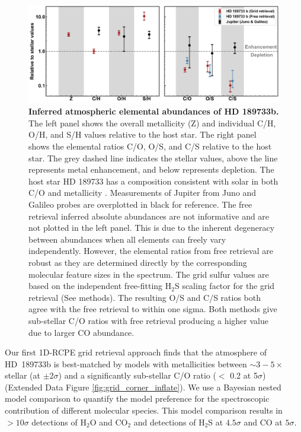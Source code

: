 \documentclass[sn-standardnature]{sn-jnl}%
\begin{document}
\begin{figure}
\centering
  \includegraphics[width=\textwidth,keepaspectratio]{figs/Fig4.pdf}
  \caption{\textbf{Inferred atmospheric elemental abundances of HD 189733b.} The left panel shows the overall metallicity (Z) and individual C/H, O/H, and S/H values relative to the host star. The right panel shows the elemental ratios C/O, O/S, and C/S relative to the host star. The grey dashed line indicates the stellar values, above the line represents metal enhancement, and below represents depletion. The host star HD 189733 has a composition consistent with solar in both C/O and metallicity \cite{brewer_co_2016}.  Measurements of Jupiter from Juno and Galileo probes \cite{atreya_origin_2016, li_water_2020} are overplotted in black for reference. The free retrieval inferred absolute abundances are not informative and are not plotted in the left panel. This is due to the inherent degeneracy between abundances when all elements can freely vary independently. However, the elemental ratios from free retrieval are robust as they are determined directly by the corresponding molecular feature sizes in the spectrum. The grid sulfur values are based on the independent free-fitting H$_2$S scaling factor for the grid retrieval (See methods). The resulting O/S and C/S ratios both agree with the free retrieval to within one sigma. Both methods give sub-stellar C/O ratios with free retrieval producing a higher value due to larger CO abundance.}
  \label{fig:fig4}
\end{figure}


Our first 1D-RCPE grid retrieval approach finds that the atmosphere of HD~189733b is best-matched by models with metallicities between $\sim3-5\times$ stellar (at $\pm2\sigma$) and a significantly sub-stellar C/O ratio ($<$ 0.2 at 5$\sigma$) (Extended Data Figure \ref{fig:grid_corner_inflate}). We use a Bayesian nested model comparison to quantify the model preference for the spectroscopic contribution of different molecular species. This model comparison results in $>10\sigma$ detections of H$_2$O and CO$_2$ and detections of H$_2$S at $4.5\sigma$ and CO at $5\sigma$. 
\end{document}
